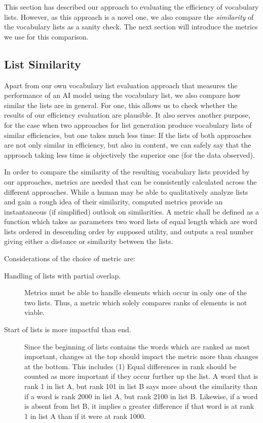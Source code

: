 This section has described our approach to evaluating the efficiency of vocabulary lists.
However, as this approach is a novel one, we also compare the \textit{similarity} of the vocabulary lists as a sanity check.
The next section will introduce the metrics we use for this comparison.

\subsection{List Similarity}
Apart from our own vocabulary list evaluation approach that measures the performance of an AI model using the vocabulary list, we also compare how similar the lists are in general.
For one, this allows us to check whether the results of our efficiency evaluation are plausible.
It also serves another purpose, for the case when two approaches for list generation produce vocabulary lists of similar efficiencies, but one takes much less time:
If the lists of both approaches are not only similar in efficiency, but also in content, we can safely say that the approach taking less time is objectively the superior one (for the data observed).

In order to compare the similarity of the resulting vocabulary lists provided by our approaches, metrics are needed that can be consistently calculated across the different approaches.
While a human may be able to qualitatively analyze lists and gain a rough idea of their similarity, computed metrics provide an instantaneous (if simplified) outlook on similarities.
A metric shall be defined as a function which takes as parameters two word lists of equal length which are word lists ordered in descending order by supposed utility, and outputs a real number giving either a distance or similarity between the lists.

Considerations of the choice of metric are:

\begin{description}
	\item [Handling of lists with partial overlap.]
	      Metrics must be able to handle elements which occur in only one of the two lists.
	      Thus, a metric which solely compares ranks of elements is not viable.
	\item [Start of lists is more impactful than end.]
	      Since the beginning of lists contains the words which are ranked as most important, changes at the top should impact the metric more than changes at the bottom. This includes (1) Equal differences in rank should be counted as more important if they occur further up the list.
	      A word that is rank 1 in list A, but rank 101 in list B says more about the similarity than if a word is rank 2000 in list A, but rank 2100 in list B. Likewise, if a word is absent from list B, it implies a greater difference if that word is at rank 1 in list A than if it were at rank 1000.
\end{description}

